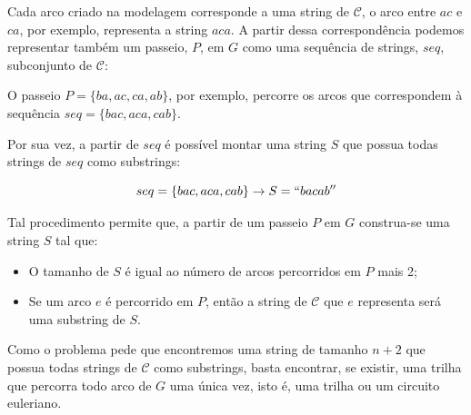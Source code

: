 \documentclass[12pt, a4paper]{article}
\begin{document}
        \begin{figure}[H]
            \centering
        \end{figure}


        Cada arco criado na modelagem corresponde a uma string de $\mathcal{C}$, o arco entre $ac$ e $ca$, por exemplo, representa a string $aca$.
        A partir dessa correspondência podemos representar também um passeio, $P$, em $G$ como uma sequência de strings, $seq$, subconjunto de $\mathcal{C}$:

        O passeio $P = \{ba, ac, ca, ab\}$, por exemplo, percorre os arcos que correspondem à sequência $seq = \{bac, aca, cab\}$.

        Por sua vez, a partir de $seq$ é possível montar uma string $S$ que possua todas strings de $seq$ como substrings:

        \[seq = \{bac, aca, cab\} \rightarrow S = ``bacab'' \]

        Tal procedimento permite que, a partir de um passeio $P$ em $G$ construa-se uma string $S$ tal que:
        
        \begin{itemize}
            \item O tamanho de $S$ é igual ao número de arcos percorridos em $P$ mais 2;
            \item Se um arco $e$ é percorrido em $P$, então a string de $\mathcal{C}$ que $e$ representa será uma substring de $S$.
        \end{itemize}

        Como o problema pede que encontremos uma string de tamanho $n+2$ que possua todas strings de $\mathcal{C}$ como substrings, basta encontrar, se existir, uma trilha que percorra todo arco de $G$ uma única vez, isto é, uma trilha ou um circuito euleriano.
\end{document}
